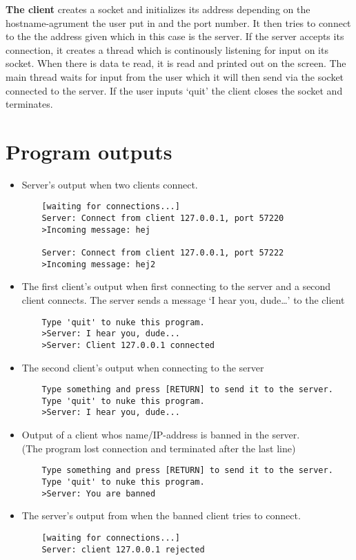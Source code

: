 \documentclass{article}
\begin{document}
\textbf{The client} creates a socket and initializes its address depending on the hostname-agrument the user put in and the port number. It then tries to connect to the the address given which in this case is the server. If the server accepts its connection, it creates a thread which is continously listening for input on its socket. When there is data te read, it is read and printed out on the screen. The main thread waits for input from the user which it will then send via the socket connected to the server. If the user inputs `quit' the client closes the socket and terminates.
\\
\section{Program outputs}
\begin{itemize}
    \item Server's output when two clients connect.
    \begin{verbatim}
    [waiting for connections...]
    Server: Connect from client 127.0.0.1, port 57220
    >Incoming message: hej

    Server: Connect from client 127.0.0.1, port 57222
    >Incoming message: hej2
    \end{verbatim}
\item The first client's output when first connecting to the server and a second client connects. The server sends a message `I hear you, dude\ldots' to the client 
    \begin{verbatim}
    Type 'quit' to nuke this program.
    >Server: I hear you, dude...
    >Server: Client 127.0.0.1 connected
    \end{verbatim}

    \item The second client's output when connecting to the server
    \begin{verbatim}
    Type something and press [RETURN] to send it to the server.
    Type 'quit' to nuke this program.
    >Server: I hear you, dude...
    \end{verbatim}

    \item Output of a client whos name/IP-address is banned in the server.\\(The program lost connection and terminated after the last line)
    \begin{verbatim}
    Type something and press [RETURN] to send it to the server.
    Type 'quit' to nuke this program.
    >Server: You are banned
    \end{verbatim}

    \item The server's output from when the banned client tries to connect.
    \begin{verbatim}
    [waiting for connections...]
    Server: client 127.0.0.1 rejected
    \end{verbatim}
\end{itemize}
\end{document}
